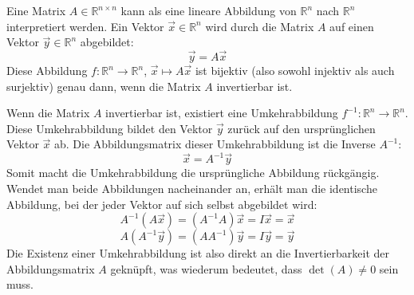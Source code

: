 Eine Matrix \(A \in \mathbb{R}^{n \times n}\) kann als eine lineare Abbildung von \(\mathbb{R}^n\) nach \(\mathbb{R}^n\) interpretiert werden. Ein Vektor \(\vec{x} \in \mathbb{R}^n\) wird durch die Matrix \(A\) auf einen Vektor \(\vec{y} \in \mathbb{R}^n\) abgebildet:
\[ \vec{y} = A\vec{x} \]
Diese Abbildung \(f: \mathbb{R}^n \rightarrow \mathbb{R}^n\), \(\vec{x} \mapsto A\vec{x}\) ist bijektiv (also sowohl injektiv als auch surjektiv) genau dann, wenn die Matrix \(A\) invertierbar ist.

Wenn die Matrix \(A\) invertierbar ist, existiert eine Umkehrabbildung \(f^{-1}: \mathbb{R}^n \rightarrow \mathbb{R}^n\). Diese Umkehrabbildung bildet den Vektor \(\vec{y}\) zurück auf den ursprünglichen Vektor \(\vec{x}\) ab. Die Abbildungsmatrix dieser Umkehrabbildung ist die Inverse \(A^{-1}\):
\[ \vec{x} = A^{-1}\vec{y} \]
Somit macht die Umkehrabbildung die ursprüngliche Abbildung rückgängig. Wendet man beide Abbildungen nacheinander an, erhält man die identische Abbildung, bei der jeder Vektor auf sich selbst abgebildet wird:
\[ A^{-1}(A\vec{x}) = (A^{-1}A)\vec{x} = I\vec{x} = \vec{x} \]
\[ A(A^{-1}\vec{y}) = (AA^{-1})\vec{y} = I\vec{y} = \vec{y} \]
Die Existenz einer Umkehrabbildung ist also direkt an die Invertierbarkeit der Abbildungsmatrix \(A\) geknüpft, was wiederum bedeutet, dass \(\det(A) \neq 0\) sein muss.


